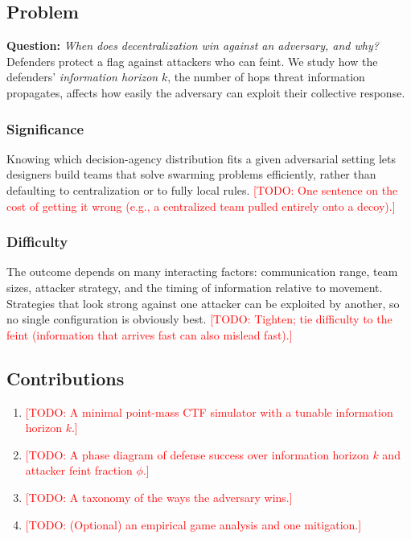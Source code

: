 \documentclass[conference]{IEEEtran}
\newcommand{\todo}[1]{\textcolor{red}{[TODO: #1]}}
\newcommand{\hor}{k}           %
\newcommand{\feint}{\phi}      %
\begin{document}
\subsection{Problem}
\textbf{Question:} \emph{When does decentralization win against an adversary, and why?}
Defenders protect a flag against attackers who can feint. We study how the defenders' \emph{information horizon} $\hor$, the number of hops threat information propagates, affects how easily the adversary can exploit their collective response.

\subsubsection{Significance}
Knowing which decision-agency distribution fits a given adversarial setting lets designers build teams that solve swarming problems efficiently, rather than defaulting to centralization or to fully local rules.
\todo{One sentence on the cost of getting it wrong (e.g., a centralized team pulled entirely onto a decoy).}

\subsubsection{Difficulty}
The outcome depends on many interacting factors: communication range, team sizes, attacker strategy, and the timing of information relative to movement. Strategies that look strong against one attacker can be exploited by another, so no single configuration is obviously best.
\todo{Tighten; tie difficulty to the feint (information that arrives fast can also mislead fast).}

\subsection{Contributions}
\begin{enumerate}
  \item \todo{A minimal point-mass CTF simulator with a tunable information horizon $\hor$.}
  \item \todo{A phase diagram of defense success over information horizon $\hor$ and attacker feint fraction $\feint$.}
  \item \todo{A taxonomy of the ways the adversary wins.}
  \item \todo{(Optional) an empirical game analysis and one mitigation.}
\end{enumerate}
\end{document}
